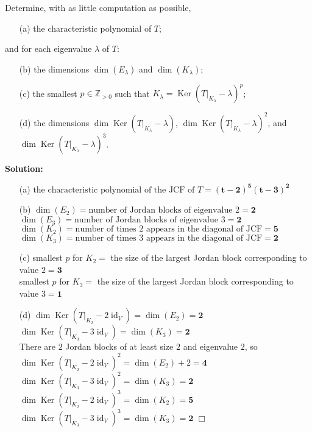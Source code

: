 \documentclass[12pt]{article}
\DeclareMathOperator{\id}{id}
\DeclareMathOperator{\Ker}{Ker}
\begin{document}
\noindent Determine, with as little computation as possible,
\begin{enumerate}
    \item[(a)] the characteristic polynomial of $T$; 
\end{enumerate}
and for each eigenvalue $\lambda$ of $T$:
\begin{enumerate}
    \item[(b)] the dimensions $\dim(E_{\lambda})$ and $\dim(K_{\lambda})$;
    \item[(c)] the smallest $p \in \mathbb{Z}_{>0}$ such that $K_{\lambda} = \Ker(T|_{K_{\lambda}} - \lambda)^p$;
    \item[(d)] the dimensions $\dim \Ker(T|_{K_{\lambda}} - \lambda)$, $\dim \Ker(T|_{K_{\lambda}} - \lambda)^2$, and $\dim \Ker(T|_{K_{\lambda}} - \lambda)^3$. 
\end{enumerate}

\noindent \textbf{Solution:}
    \begin{enumerate}
        \item[(a)] $\text{the characteristic polynomial of the JCF of } T = \mathbf{(t - 2)^5(t - 3)^2}$ 
        \item[(b)] $\dim(E_2) = \text{number of Jordan blocks of eigenvalue 2} = \mathbf{2}$ \\
        $\dim(E_3) = \text{number of Jordan blocks of eigenvalue 3} = \mathbf{2}$ \\
        $\dim(K_2) = \text{number of times 2 appears in the diagonal of JCF} = \mathbf{5}$ \\
        $\dim(K_3) = \text{number of times 3 appears in the diagonal of JCF} = \mathbf{2}$
        \item[(c)] smallest $p$ for $K_2 = $ the size of the largest Jordan block corresponding to value $2 = \mathbf{3}$ \\
        smallest $p$ for $K_3 = $ the size of the largest Jordan block corresponding to value $3 = \mathbf{1}$
        \item[(d)] $\dim \Ker(T|_{K_2} - 2\id_V) = \dim(E_2) = \mathbf{2}$ \\
        $\dim \Ker(T|_{K_3} - 3\id_V) = \dim(K_3) = \mathbf{2}$ \\
        There are $2$ Jordan blocks of at least size $2$ and eigenvalue $2$, so \\
        $\dim \Ker(T|_{K_2} - 2\id_V)^2 = \dim(E_2) + 2 = \mathbf{4}$ \\
        $\dim \Ker(T|_{K_3} - 3\id_V)^2 = \dim(K_3) = \mathbf{2}$  \\
        $\dim \Ker(T|_{K_2} - 2\id_V)^3 = \dim(K_2) = \mathbf{5}$ \\
        $\dim \Ker(T|_{K_3} - 3\id_V)^3 = \dim(K_3) = \mathbf{2}$ \hfill $\Box$
    \end{enumerate} 
\newpage
\end{document}
